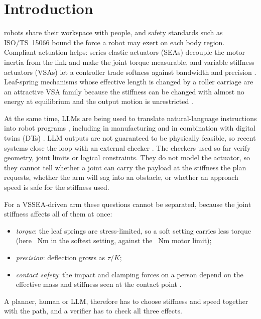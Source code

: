 \documentclass[journal]{IEEEtran}
\begin{document}
\section{Introduction}
 robots share their workspace with people, and safety standards such as ISO/TS~15066 \cite{iso15066} bound the force a robot may exert on each body region. Compliant actuation helps: series elastic actuators (SEAs) \cite{pratt1995} decouple the motor inertia from the link and make the joint torque measurable, and variable stiffness actuators (VSAs) \cite{vanderborght2013,wolf2016,grioli2015} let a controller trade softness against bandwidth and precision \cite{bicchi2004,albu2008}. Leaf-spring mechanisms whose effective length is changed by a roller carriage are an attractive VSA family because the stiffness can be changed with almost no energy at equilibrium and the output motion is unrestricted \cite{choi2011,sariyildiz2023,sariyildiz2024}.

At the same time, LLMs are being used to translate natural-language instructions into robot programs \cite{ahn2022,liang2023,singh2023,vemprala2023}, including in manufacturing \cite{dong2025,antero2024,yang2024autoplc} and in combination with digital twins (DTs) \cite{deng2025}. LLM outputs are not guaranteed to be physically feasible, so recent systems close the loop with an external checker \cite{skreta2023,chen2024autotamp,yang2024safety,kambhampati2024}. The checkers used so far verify geometry, joint limits or logical constraints. They do not model the actuator, so they cannot tell whether a joint can carry the payload at the stiffness the plan requests, whether the arm will sag into an obstacle, or whether an approach speed is safe for the stiffness used.

For a VSSEA-driven arm these questions cannot be separated, because the joint stiffness affects all of them at once:
\begin{itemize}
\item \emph{torque}: the leaf springs are stress-limited, so a soft setting carries less torque (here \taucapSoft~Nm in the softest setting, against the \tauMone~Nm motor limit);
\item \emph{precision}: deflection grows as $\tau/K$;
\item \emph{contact safety}: the impact and clamping forces on a person depend on the effective mass and stiffness seen at the contact point \cite{haddadin2009}.
\end{itemize}
A planner, human or LLM, therefore has to choose stiffness and speed together with the path, and a verifier has to check all three effects.
\end{document}
